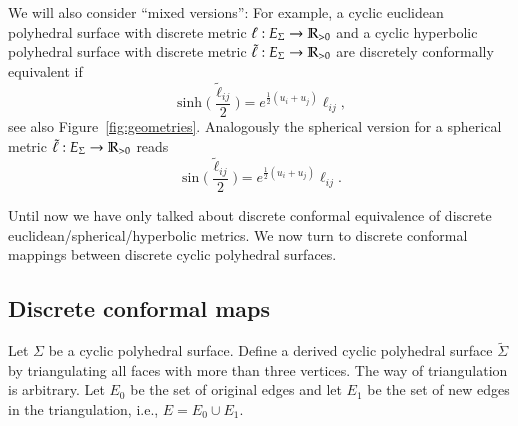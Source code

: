 \documentclass[Thesis]{subfiles}
\begin{document}
We will also consider ``mixed versions'': For example, a cyclic
euclidean polyhedral surface with discrete metric
$\ell:E_{\Sigma}\rightarrow\mathbb R_{>0}$ and a cyclic hyperbolic polyhedral
surface with discrete metric $\tilde\ell:E_{\Sigma}\rightarrow\mathbb R_{>0}$
are discretely conformally equivalent if
\begin{equation*}
\sinh\Big(\frac{\tilde\ell_\mathit{ij}}{2}\Big)
= e^{\frac{1}{2}(u_{i}+u_{j})}\ell_\mathit{ij},
\end{equation*}
see also Figure~\ref{fig:geometries}. 
Analogously the spherical version for a spherical metric $\tilde\ell:E_{\Sigma}\rightarrow\mathbb R_{>0}$ reads
\begin{equation*}
\sin\Big(\frac{\tilde\ell_\mathit{ij}}{2}\Big)
= e^{\frac{1}{2}(u_{i}+u_{j})}\ell_\mathit{ij}.
\end{equation*}



Until now we have only talked about discrete conformal equivalence of discrete euclidean/spherical/hyperbolic metrics.
We now turn to discrete conformal mappings between discrete cyclic polyhedral surfaces.

\subsection{Discrete conformal maps}

Let $\Sigma$ be a cyclic polyhedral surface. Define a derived cyclic polyhedral
surface $\tilde \Sigma$ by triangulating all faces with more than three vertices. The way of triangulation
is arbitrary. Let $E_0$ be the set of original edges and let $E_1$ be the set of new edges
in the triangulation, i.e., $E=E_0\cup E_1$.
\end{document}
